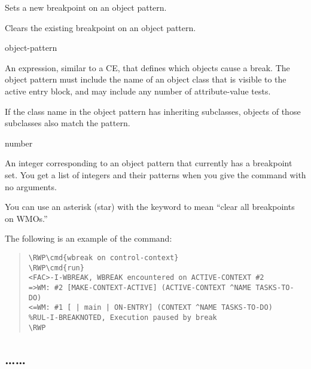 {{\begin{arguments}
\item[\normalfont\co{ON}]

  Sets a new breakpoint on an object pattern.

\item[\normalfont\co{OFF}]

  Clears the existing breakpoint on an object pattern.

\item[object-pattern]

  An expression, similar to a CE, that defines which objects cause a
  break. The object pattern must include the name of an object class
  that is visible to the active entry block, and may include any
  number of attribute-value tests.

  If the class name in the object pattern has inheriting subclasses,
  objects of those subclasses also match the pattern.

\item[number]

  An integer corresponding to an object pattern that currently has a
  breakpoint set. You get a list of integers and their patterns when
  you give the  command with no arguments.

\item[\normalfont\co{*}]

  You can use an asterisk (star) with the  keyword to mean
  ``clear all breakpoints on WMOs.''
\end{arguments}

\Example

The following is an example of the  command:

\begin{quote}
\begin{Verbatim}[commandchars=\\\{\}]
\RWP\cmd{wbreak on control-context}
\RWP\cmd{run}
<FAC>-I-WBREAK, WBREAK encountered on ACTIVE-CONTEXT #2
=>WM: #2 [MAKE-CONTEXT-ACTIVE] (ACTIVE-CONTEXT ^NAME TASKS-TO-DO)
<=WM: #1 [ | main | ON-ENTRY] (CONTEXT ^NAME TASKS-TO-DO)
%RUL-I-BREAKNOTED, Execution paused by break
\RWP
\end{Verbatim}
\end{quote}

\subsection{\ldots{}\ldots}

}}
